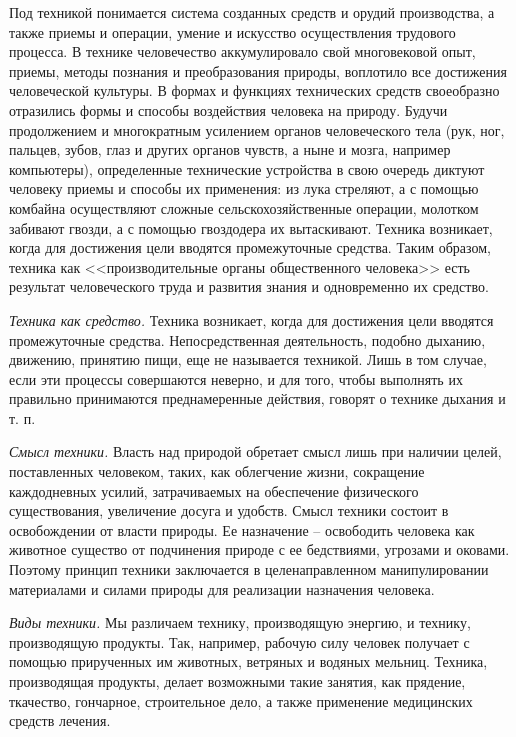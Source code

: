 Под техникой понимается система созданных средств и орудий производства, а 
также приемы и операции, умение и искусство осуществления трудового процесса. 
В технике человечество аккумулировало свой многовековой опыт, приемы, методы 
познания и преобразования природы, воплотило все достижения человеческой 
культуры. В формах и функциях технических средств своеобразно отразились формы 
и способы воздействия человека на природу. Будучи продолжением и многократным 
усилением органов человеческого тела (рук, ног, пальцев, зубов, глаз и других 
органов чувств, а ныне и мозга, например компьютеры), определенные технические 
устройства в свою очередь диктуют человеку приемы и способы их применения: из 
лука стреляют, а с помощью комбайна осуществляют сложные сельскохозяйственные 
операции, молотком забивают гвозди, а с помощью гвоздодера их вытаскивают. 
Техника возникает, когда для достижения цели вводятся промежуточные средства. 
Таким образом, техника как <<производительные органы общественного человека>> 
есть результат человеческого труда и развития знания и одновременно их 
средство. \cite{net:02}

\textit{Техника как средство.} Техника возникает, когда для достижения цели 
вводятся промежуточные средства. Непосредственная деятельность, подобно 
дыханию, движению, принятию пищи, еще не называется техникой. Лишь в том 
случае, если эти процессы совершаются неверно, и для того, чтобы выполнять 
их правильно принимаются преднамеренные действия, говорят о технике дыхания 
и т. п.

\textit{Смысл техники.} Власть над природой обретает смысл лишь при наличии 
целей, поставленных человеком, таких, как облегчение жизни, сокращение 
каждодневных усилий, затрачиваемых на обеспечение физического существования, 
увеличение досуга и удобств. Смысл техники состоит в освобождении от власти 
природы. Ее назначение -- освободить человека как животное существо от 
подчинения природе с ее бедствиями, угрозами и оковами. Поэтому принцип 
техники заключается в целенаправленном манипулировании материалами и силами 
природы для реализации назначения человека.

\textit{Виды техники.} Мы различаем технику, производящую энергию, и технику, 
производящую продукты. Так, например, рабочую силу человек получает с помощью 
прирученных им животных, ветряных и водяных мельниц. Техника, производящая 
продукты, делает возможными такие занятия, как прядение, ткачество, гончарное, 
строительное дело, а также применение медицинских средств лечения.

